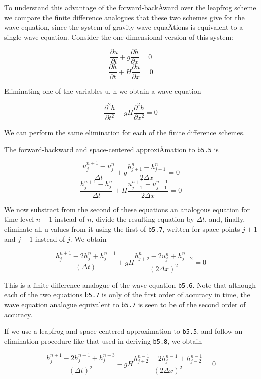 To understand this advantage of the forward-backÂ­ward over the leapfrog
scheme we compare the finite difference analogues that these two schemes
give for the wave equation, since the system of gravity wave equaÂ­tions
is equivalent to a single wave equation. Consider the one-dimensional
version of this system:

{\[\frac{\partial u}{\partial t} + g\frac{\partial h}{\partial x} = 0\]\[\frac{\partial h}{\partial t} + H\frac{\partial u}{\partial x} = 0\]}

Eliminating one of the variables u, h we obtain a wave equation

{\[\frac{\partial^{2} h}{\partial t^{2}} - gH\frac{\partial^{2} h}{\partial x^{2}} = 0\]}

We can perform the same elimination for each of the finite difference
schemes.

The forward-backward and space-centered approxiÂ­mation to \texttt{b5.5}
is

{\[\frac{u_j^{n + 1} - u_j^n}{\Delta t} + g\frac{h_{j + 1}^{n} - h_{j - 1}^{n}}{2\Delta x} = 0\]\[\frac{h_j^{n + 1} - h_j^n}{\Delta t} + H\frac{u_{j + 1}^{n + 1} - u_{j - 1}^{n + 1}}{2\Delta x} = 0\]}

We now substract from the second of these equations an analogous
equation for time level \(n - 1\) instead of \(n\), divide the resulting
equation by \(\Delta t\), and, finally, eliminate all u values from it
using the first of \texttt{b5.7}, written for space points \(j + 1\) and
\(j - 1\) instead of \(j\). We obtain

{\[\frac{h_{j}^{n + 1} - 2h_{j}^{n} + h_{j}^{n - 1}}{\left( \Delta t \right)} 
+ gH\frac{h_{j + 2}^{n} - 2u_j^{n} + h_{j - 2}^{n}}{\left( 2\Delta x \right)^{2}} = 0\]}

This is a finite difference analogue of the wave equation \texttt{b5.6}.
Note that although each of the two equations \texttt{b5.7} is only of
the first order of accuracy in time, the wave equation analogue
equivalent to \texttt{b5.7} is seen to be of the second order of
accuracy.

If we use a leapfrog and space-centered approximation to \texttt{b5.5},
and follow an elimination procedure like that used in deriving
\texttt{b5.8}, we obtain

{\[\frac{h_j^{n + 1} - 2h_ j^{n - 1} + h_j^{n - 3}}{\left( \Delta t \right)^{2}} 
- gH\frac{h_{j + 2}^{n - 1} - 2h_j^{n - 1} + h_{j - 2}^{n - 1}}{\left( 2\Delta x \right)^{2}} = 0\]}

